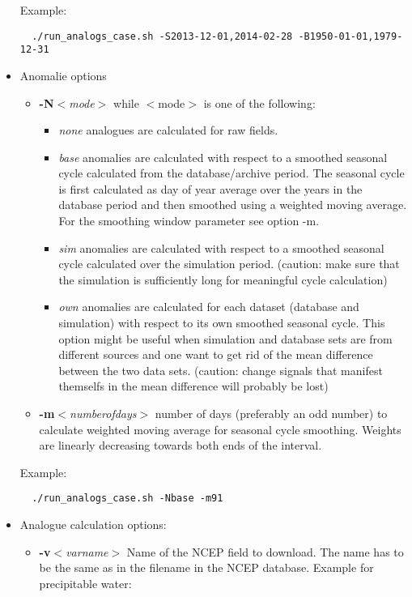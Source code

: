 \documentclass[11p,a4paper]{article}
\begin{document}
\begin{itemize}
\begin{itemize}
 \end{itemize}  
 Example:
 \begin{verbatim}
  ./run_analogs_case.sh -S2013-12-01,2014-02-28 -B1950-01-01,1979-12-31
 \end{verbatim}
 \item Anomalie options
 \begin{itemize}
  \item \textbf{-N}\textit{$<$mode$>$} while $<$mode$>$ is one of the following:
  \begin{itemize}
   \item \textit{none}  analogues are calculated for raw fields.
   \item \textit{base}  anomalies are calculated with respect to a smoothed seasonal cycle calculated from the database/archive period. The seasonal cycle is first calculated as day of year average over the years in the database period and then smoothed using a weighted moving average. For the smoothing window parameter see option -m. 
   \item \textit{sim} anomalies are calculated with respect to a smoothed seasonal cycle calculated over the simulation period. (caution: make sure that the simulation is sufficiently long for meaningful cycle calculation)
   \item \textit{own} anomalies are calculated for each dataset (database and simulation) with respect to its own smoothed seasonal cycle. This option might be useful when simulation and database sets are from different sources and one want to get rid of the mean difference between the two data sets. (caution: change signals that manifest themselfs in the mean difference will probably be lost)
  \end{itemize}  
  \item \textbf{-m}\textit{$<$numberofdays$>$} number of days (preferably an odd number) to calculate weighted moving average for seasonal cycle smoothing. Weights are linearly decreasing towards  both ends of the interval.
 \end{itemize}
 Example:
 \begin{verbatim}
  ./run_analogs_case.sh -Nbase -m91
 \end{verbatim}
 \item Analogue calculation options:
 \begin{itemize}
  \item \textbf{-v}\textit{$<$varname$>$} Name of the NCEP field to download. The name has to be the same as in the filename in the NCEP database.
  Example for precipitable water:

\end{itemize}
\end{itemize}
\end{document}
